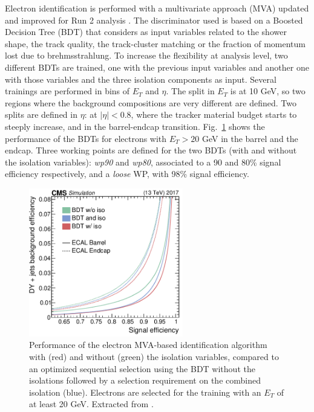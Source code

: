 \documentclass[../main.tex]{subfiles}
\begin{document}
Electron identification is performed with a multivariate approach (MVA) updated and improved for Run 2 analysis \cite{intro:id:ele_mva}. The discriminator used is based on a Boosted Decision Tree (BDT) that considers as input variables related to the shower shape, the track quality, the track-cluster matching or the fraction of momentum lost due to brehmsstrahlung. To increase the flexibility at analysis level, two different BDTs are trained, one with the previous input variables and another one with those variables and the three isolation components as input. Several trainings are performed in bins of $E_T$ and $\eta$. The split in $E_T$ is at 10 GeV, so two regions where the background compositions are very different are defined. Two splits are defined in $\eta$: at $|\eta|<0.8$, where the tracker material budget starts to steeply increase, and in the barrel-endcap transition. Fig.~\ref{intro:fig:ele_mva} shows the performance of the BDTs for electrons with $E_T > 20$ GeV in the barrel and the endcap. Three working points are defined for the two BDTs (with and without the isolation variables): \textit{wp90} and \textit{wp80}, associated to a 90 and 80\% signal efficiency respectively, and a \textit{loose} WP, with 98\% signal efficiency.

\begin{figure}[h!]
\begin{center}
\includegraphics[width=0.6\textwidth]{Images/ele_mva}
\end{center}
\caption{Performance of the electron MVA-based identification algorithm with (red) and without (green) the isolation variables, compared to an optimized sequential selection using the BDT without the isolations followed by a selection requirement on the combined isolation (blue). Electrons are selected for the training with an $E_T$ of at least 20 GeV. Extracted from \cite{intro:id:ele_mva}.}
\label{intro:fig:ele_mva}
\end{figure}
\end{document}
